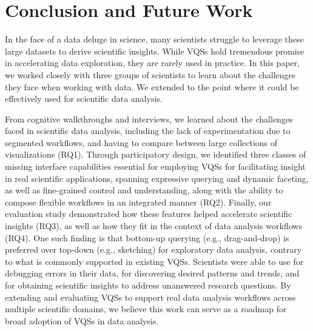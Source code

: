 \section{Conclusion and Future Work} \label{conclusion}
\par In the face of a data deluge in science, many scientists struggle to leverage these large datasets to derive scientific insights. While VQSs hold tremendous promise in accelerating data exploration, they are rarely used in practice. In this paper, we worked closely with three groups of scientists to learn about the challenges they face when working with data. We extended  to the point where it could be effectively used for scientific data analysis. 
\par From cognitive walkthroughs and interviews, we learned about the challenges faced in scientific data analysis, including the lack of experimentation due to segmented workflows, and having to compare between large collections of visualizations (RQ1). Through participatory design, we identified three classes of missing interface capabilities  essential for employing VQSs for facilitating insight in real scientific applications, spanning expressive querying and dynamic faceting, as well as fine-grained control and understanding, along with the ability to compose flexible workflows in an integrated manner (RQ2). Finally, our evaluation study demonstrated how these features helped accelerate scientific insights (RQ3), as well as how they fit in the context of data analysis workflows (RQ4). One such finding is that bottom-up querying (e.g., drag-and-drop) is preferred over top-down (e.g., sketching) for exploratory data analysis, contrary to what is commonly supported in existing VQSs. Scientists were able to use \zv for debugging errors in their data, for discovering desired patterns and trends, and for obtaining scientific insights to address unanswered research questions. By extending and evaluating VQSs to support real data analysis workflows across multiple scientific domains, we believe this work can serve as a roadmap for broad adoption of VQSs in data analysis.

